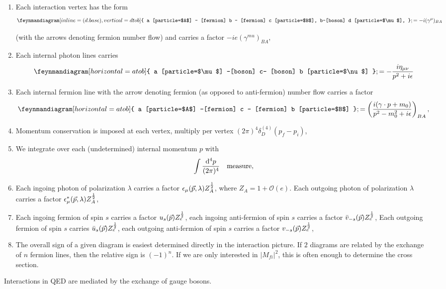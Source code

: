\begin{enumerate}
	\item Each interaction vertex has the form 
	\begin{equation}
	\feynmandiagram[inline=(d.base), vertical=d to b] {
		a [particle=$A$] -- [fermion] b -- [fermion] c [particle=$B$],
		b--[boson] d [particle=$\mu$],	
	}; = -i (\gamma^{\mu})_{BA}
	\end{equation}
	
	(with the arrows denoting fermion number flow) and carries a factor $-i e (\gamma^{mu})_{BA}$,
	\item Each internal photon lines carries
	\begin{equation}
	\feynmandiagram[ horizontal=a to b]{
		a [particle=$\mu$] --[boson] c-- [boson] b [particle=$\nu$]
	};
	= -\frac{i \eta_{\mu \nu} }{p^2 + i \epsilon}
	\end{equation}
	\item Each internal fermion line with the arrow denoting fermion (as opposed to anti-fermion) number flow carries a factor 
	\begin{equation}
	\feynmandiagram[horizontal=a to b]{
		a [particle=$A$] --[fermion] c -- [fermion] b [particle=$B$]
	};
	= \left(\frac{i(\gamma \cdot p + m_0)}{p^2-m^2_0 +i \epsilon }\right)_{BA},
	\end{equation}
	\item Momentum conservation is imposed at each vertex, multiply per vertex $(2 \pi)^4 \delta^{(4)}_D(p_f-p_i)$,
	\item We integrate over each (undetermined) internal momentum $p$ with
	\begin{equation}
	\int \frac{\mathrm{d}^4 p}{(2 \pi)^4} \quad \mathrm{measure},
	\end{equation}
	\item Each ingoing photon of polarization $\lambda$ carries a factor $\epsilon_{\mu} (\vec{p},\lambda) Z^{\frac{1}{2}}_A$, where $Z_A =1+\mathcal{O}(e)$. Each outgoing photon of polarization $\lambda$ carries a factor $\epsilon^*_{\mu} (\vec{p},\lambda) Z^{\frac{1}{2}}_A$,
	\item Each ingoing fermion of spin $s$ carries a factor $u_s(\vec{p}) Z^{\frac{1}{2}}_e$, each  ingoing anti-fermion of spin $s$ carries a factor $\bar{v}_{-s}(\vec{p})Z^{\frac{1}{2}}_e$, Each outgoing fermion of spin $s$ carries $\bar{u}_s(\vec{p}) Z^{\frac{1}{2}}_e$, each outgoing anti-fermion of spin $s$ carries a factor $v_{-s}(\vec{p})Z^{\frac{1}{2}}_e$,
	\item The overall sign of a given diagram is easiest determined directly in the interaction picture. If $2$ diagrams are related by the exchange of $n$ fermion lines, then the relative sign is $(-1)^n$. If we are only interested in $|M_{fi}|^2$, this is often enough to determine the cross section.
\end{enumerate}
Interactions in QED are mediated by the exchange of gauge bosons.







